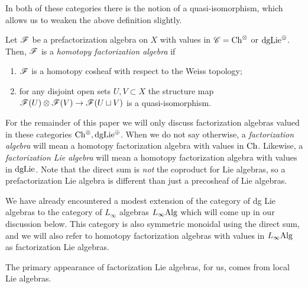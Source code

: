 \documentclass[10pt]{amsart}
\begin{document}
In both of these categories there is the notion of a quasi-isomorphism, which allows us to weaken the above definition slightly.  

\begin{dfn} 
Let $\mathscr F$ be a prefactorization algebra on $X$ with values in $\mathscr C = {\rm Ch}^{\otimes}$ or ${\rm dgLie}^{\oplus}$. 
Then, $\mathscr F$ is a {\em homotopy factorization algebra} if
\begin{enumerate}
\item $\mathscr F$ is a homotopy cosheaf with respect to the Weiss topology;
\item for any disjoint open sets $U, V \subset X$ the structure map $\mathscr F(U) \otimes \mathscr F(V) \to \mathscr F(U \sqcup V)$ is a quasi-isomorphism.
\end{enumerate}
\end{dfn}


For the remainder of this paper we will only discuss factorization algebras valued in these categories ${\rm Ch}^\otimes, {\rm dgLie}^{\oplus}$.
When we do not say otherwise, a {\em factorization algebra} will mean a homotopy factorization algebra with values in ${\rm Ch}$. 
Likewise, a {\em factorization Lie algebra} will mean a homotopy factorization algebra with values in ${\rm dgLie}$. 
Note that the direct sum is {\em not} the coproduct for Lie algebras, so a prefactorization Lie algebra is different than just a precosheaf of Lie algebras. 

We have already encountered a modest extension of the category of dg Lie algebras to the category of $L_\infty$ algebras $L_\infty{\rm Alg}$ which will come up in our discussion below.
This category is also symmetric monoidal using the direct sum, and we will also refer to homotopy factorization algebras with values in $L_\infty{\rm Alg}$ as factorization Lie algebras.

The primary appearance of factorization Lie algebras, for us, comes from local Lie algebras.
 
\end{document}

